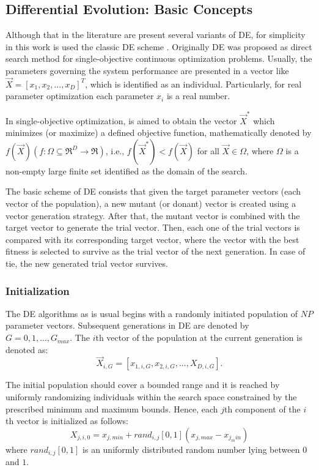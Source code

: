 \subsection{Differential Evolution: Basic Concepts}
%
Although that in the literature are present several variants of DE, for simplicity in this work is used the classic DE scheme \cite{das2011differential}.
%
Originally DE was proposed as direct search method for single-objective continuous optimization problems.
%
Usually, the parameters governing the system performance are presented in a vector like $\vec{X} = [x_1, x_2, ..., x_D ]^T$, which is identified as an individual.
%
Particularly, for real parameter optimization each parameter $x_i$ is a real number.
%

In single-objective optimization, is aimed to obtain the vector $\vec{X}^*$ which minimizes (or maximize) a defined objective function, mathematically denoted by $f(\vec{X})(f : \Omega \subseteq \Re^D \rightarrow \Re)$, i.e., $f(\vec{X}^*) < f(\vec{X})$ for all $\vec{X} \in \Omega$, where $\Omega$ is a non-empty large finite set identified as the domain of the search.
%

The basic scheme of DE consists that given the target parameter vectors (each vector of the population), a new mutant (or donant) vector is created using a vector generation strategy.
%
After that, the mutant vector is combined with the target vector to generate the trial vector.
%
Then, each one of the trial vectors is compared with its corresponding target vector, where the vector with the best fitness is selected to survive as the trial vector of the next generation.
%
In case of tie, the new generated trial vector survives.


\subsubsection{Initialization}


The DE algorithms as is usual begins with a randomly initiated population of $NP$ parameter vectors.
%
Subsequent generations in DE are denoted by $G= 0,1, ..., G_{max}$.
%
The $i$th vector of the population at the current generation is denoted as:
\begin{equation} 
\vec{X}_{i,G} = [x_{1,i,G}, x_{2,i,G},..., X_{D,i, G}].
\end{equation}
%

The initial population should cover a bounded range and it is reached by uniformly randomizing individuals within the search space constrained by the prescribed minimum and maximum bounds.
%
Hence, each $j$th component of the $i$th vector is initialized as follows:
\begin{equation}
X_{j,i,0} = x_{j,min} + rand_{i,j}[0,1] (x_{j,max} - x_{j_min})
\end{equation}
where $rand_{i,j}[0,1]$ is an uniformly distributed random number lying between $0$ and $1$.

